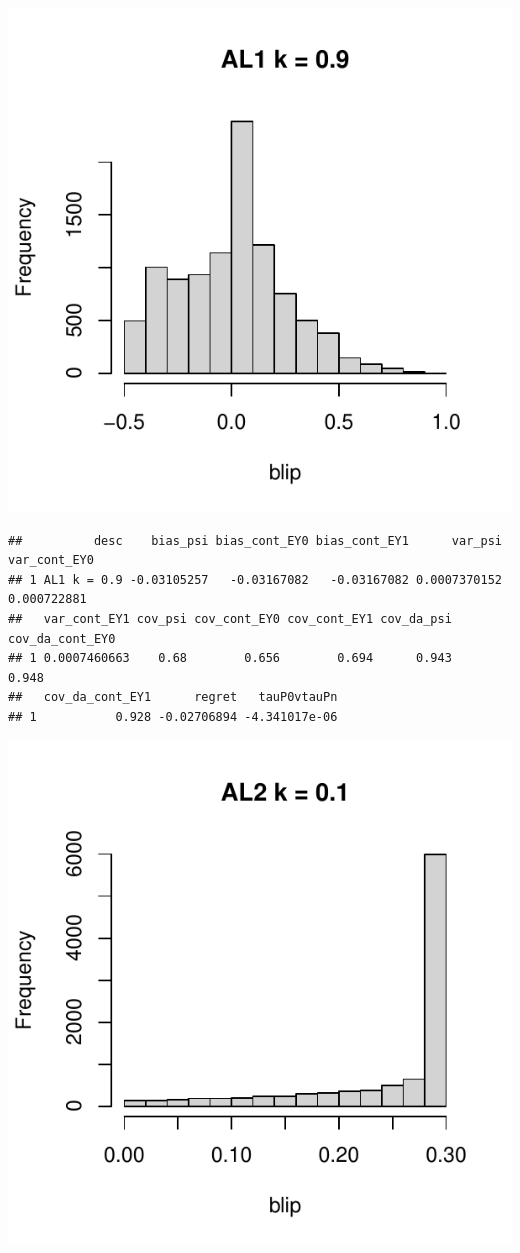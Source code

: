 \documentclass[11pt]{article}\usepackage[]{graphicx}\usepackage[table]{xcolor}
\makeatletter
\def\maxwidth{ %
  \ifdim\Gin@nat@width>\linewidth
    \linewidth
  \else
    \Gin@nat@width
  \fi
}
\newenvironment{kframe}{%
 \def\at@end@of@kframe{}%
 \ifinner\ifhmode%
  \def\at@end@of@kframe{\end{minipage}}%
  \begin{minipage}{\columnwidth}%
 \fi\fi%
 \def\FrameCommand##1{\hskip\@totalleftmargin \hskip-\fboxsep
 \colorbox{shadecolor}{##1}\hskip-\fboxsep
     \hskip-\linewidth \hskip-\@totalleftmargin \hskip\columnwidth}%
 \MakeFramed {\advance\hsize-\width
   \@totalleftmargin\z@ \linewidth\hsize
   \@setminipage}}%
 {\par\unskip\endMakeFramed%
 \at@end@of@kframe}
\newenvironment{knitrout}{}{} %
\makeatother
\begin{document}
\begin{knitrout}
\includegraphics[width=\maxwidth]{figure/unnamed-chunk-4-14} 
\begin{kframe}\begin{verbatim}
##          desc    bias_psi bias_cont_EY0 bias_cont_EY1      var_psi var_cont_EY0
## 1 AL1 k = 0.9 -0.03105257   -0.03167082   -0.03167082 0.0007370152  0.000722881
##   var_cont_EY1 cov_psi cov_cont_EY0 cov_cont_EY1 cov_da_psi cov_da_cont_EY0
## 1 0.0007460663    0.68        0.656        0.694      0.943           0.948
##   cov_da_cont_EY1      regret   tauP0vtauPn
## 1           0.928 -0.02706894 -4.341017e-06
\end{verbatim}
\end{kframe}
\includegraphics[width=\maxwidth]{figure/unnamed-chunk-4-15} 

\end{knitrout}
\end{document}
